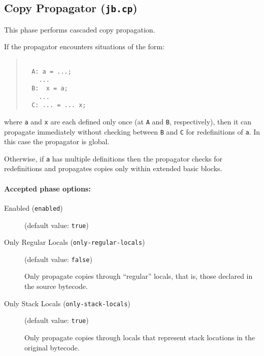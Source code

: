 \documentclass{article}
\begin{document}
\subsection{Copy Propagator ({\tt jb.cp})}

This phase performs cascaded copy propagation.  
    
If the propagator encounters situations of the form: 

\begin{quote}\begin{verbatim}

  A: a = ...; 
    ...
  B:  x = a;
    ...
  C: ... = ... x; 

\end{verbatim}\end{quote}

where {\tt a} and {\tt x} are each defined only once (at
{\tt A} and {\tt B}, respectively), then it can propagate
immediately without checking between {\tt B} and {\tt C}
for redefinitions of {\tt a}.  In
this case the propagator is global.
        
Otherwise, if {\tt a} has multiple definitions then the
propagator checks for redefinitions and propagates copies
only within extended basic blocks.


\paragraph{Accepted phase options:} 

\begin{description}

\item[Enabled ({\tt enabled})]
(default value: {\tt true})






\item[Only Regular Locals ({\tt only-regular-locals})]
(default value: {\tt false})




Only propagate copies through ``regular'' locals, that is,
those declared in the source bytecode.



\item[Only Stack Locals ({\tt only-stack-locals})]
(default value: {\tt true})




Only propagate copies through locals that represent stack locations in
the original bytecode.



\end{description}
\end{document}
